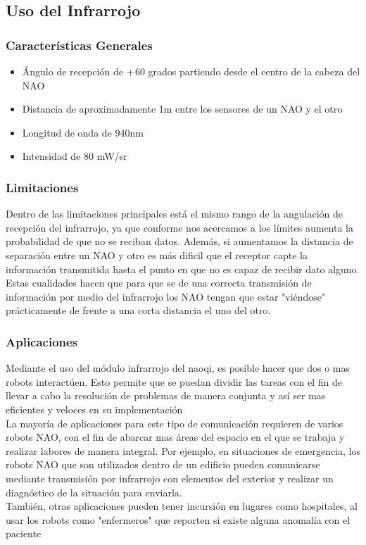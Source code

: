 \documentclass[letterpaper]{article}
\begin{document}
\subsection{Uso del Infrarrojo}
\subsubsection{Características Generales}
\begin{itemize}
\item Ángulo de recepción de $+\-$60 grados partiendo desde el centro de la cabeza del NAO
\item Distancia de aproximadamente 1m entre los sensores de un NAO y el otro
\item Longitud de onda de 940nm
\item Intensidad de 80 mW/sr
\end{itemize}

\subsubsection{Limitaciones}
Dentro de las limitaciones principales está el mismo rango de la angulación de recepción del infrarrojo, ya que conforme nos acercamos a los límites aumenta la probabilidad de que no se reciban datos. Además, si aumentamos la distancia de separación entre un NAO y otro es más dificil que el receptor capte la información transmitida hasta el punto en que no es capaz de recibir dato alguno. Estas cualidades hacen que para que se de una correcta transmisión de información por medio del infrarrojo los NAO tengan que estar "viéndose" prácticamente de frente a una corta distancia el uno del otro.\\

\subsubsection{Aplicaciones}
Mediante el uso del módulo infrarrojo del naoqi, es posible hacer que dos o mas robots interactúen. Esto permite que se puedan dividir las tareas con el fin de llevar a cabo la resolución de problemas de manera conjunta y así ser mas eficientes y veloces en su implementación\\
La mayoría de aplicaciones para este tipo de comunicación requieren de varios robots NAO, con el fin de abarcar mas áreas del espacio en el que se trabaja y realizar labores de manera integral. Por ejemplo, en situaciones de emergencia, los robots NAO que son utilizados dentro de un edificio pueden comunicarse mediante transmisión por infrarrojo con elementos del exterior y realizar un diagnóstico de la situación para enviarla. \\
También, otras aplicaciones pueden tener incursión en lugares como hospitales, al usar los robots como "enfermeros" que reporten si existe alguna anomalía con el paciente 
\end{document}
